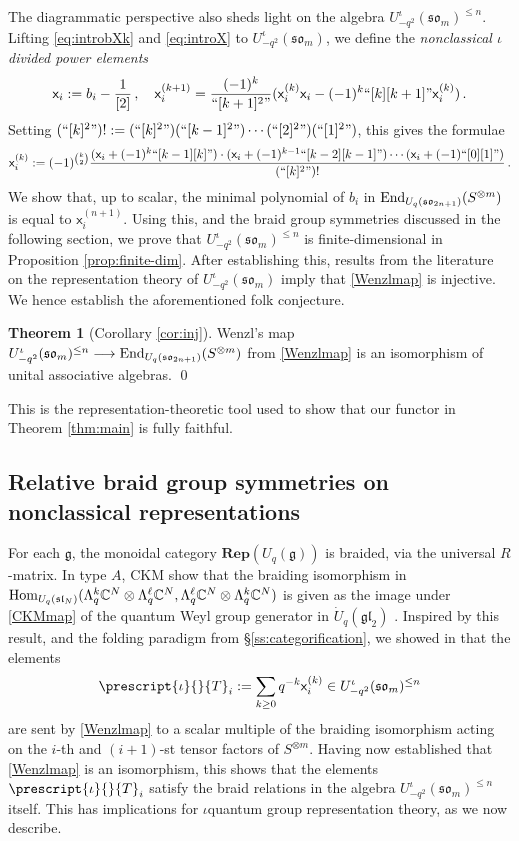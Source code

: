 \documentclass[10pt]{amsart}
\numberwithin{equation}{section}
\theoremstyle{definition}
\newtheorem{thm}{Theorem}[section]
\newcommand{\Hom}{{\rm Hom}}
\newcommand{\End}{{\rm End}}
\def\C{{\mathbb C}}
\newcommand{\sln}[1][n]{\mathfrak{sl}_{#1}}
\newcommand{\gln}[1][n]{\mathfrak{gl}_{#1}}
\newcommand{\son}[1][2n+1]{\mathfrak{so}_{#1}}
\newcommand{\som}[1][m]{\mathfrak{so}_{#1}}
\newcommand{\Rep}{\mathbf{Rep}}
\newcommand{\iqUsom}[1][m]{{U}^{\iota}_{-q^2}(\som[#1])}
\newcommand{\iQW}{\prescript{\iota}{}{T}}
\newcommand{\xxb}{\mathsf{x}}
\begin{document}
The diagrammatic perspective also sheds light on the algebra $\iqUsom^{\le n}$.
Lifting \eqref{eq:introbXk} and \eqref{eq:introX} to $\iqUsom$, 
we define the \emph{nonclassical $\iota$divided power elements}
\begin{equation}\label{eq:ddp}
\xxb_i:=b_i-\frac{1}{[2]} \, , \quad
\xxb_i^{(k+1)}=\frac{(-1)^k}{``[k+1]^2"}(\xxb_i^{(k)}\xxb_i- (-1)^k``[k][k+1]"\xxb_i^{(k)}) \, .
\end{equation}
Setting $(``[k]^2")! := (``[k]^2")(``[k-1]^2")\cdots(``[2]^2")(``[1]^2")$,
this gives the formulae
\[
\xxb_i^{(k)}:= (-1)^{\binom{k}{2}}\dfrac{(\xxb_i+(-1)^k``[k-1][k]")\cdot (\xxb_i+(-1)^{k-1}``[k-2][k-1]")\cdots (\xxb_i+(-1)``[0][1]")}{(``[k]^2")!} \, .
\]
We show that, up to scalar, the minimal polynomial of 
$b_i$ in $\End_{U_q(\son)}(S^{\otimes m})$ is equal to $\xxb_i^{(n+1)}$.
Using this, and the braid group symmetries discussed in the following section, 
we prove that $\iqUsom^{\le n}$ is finite-dimensional in Proposition \ref{prop:finite-dim}. 
After establishing this, results from the literature on the representation theory of $\iqUsom$ 
imply that \eqref{Wenzlmap} is injective. We hence establish the aforementioned folk conjecture.
\begin{thm}[{Corollary \ref{cor:inj}}]
Wenzl's map $\iqUsom^{\le n} \longrightarrow \End_{U_q(\son)}(S^{\otimes m})$ from \eqref{Wenzlmap}
is an isomorphism of unital associative algebras. \qed
	\end{thm}
This is the representation-theoretic tool used to show 
that our functor in Theorem \ref{thm:main} is fully faithful.

\subsection{Relative braid group symmetries on nonclassical representations}

For each $\mathfrak{g}$, the monoidal category $\Rep(U_q(\mathfrak{g}))$ is braided, 
via the universal $R$-matrix. 
In type $A$, CKM show that the braiding isomorphism in 
$\Hom_{U_q(\sln[N])}(\Lambda_q^k\C^N \otimes \Lambda_q^{\ell}\C^N
	, \Lambda_q^{\ell}\C^N \otimes \Lambda_q^k \C^N)$
is given as the image under \eqref{CKMmap} of the quantum Weyl group generator 
in $\dot{U}_q(\gln[2])$ \cite[\S 6]{CKM}. 
Inspired by this result, and the folding paradigm from \S \ref{ss:categorification}, 
we showed in \cite[Theorem 1.26]{BER} that the elements 
\begin{equation}\label{eq:iQW}
\iQW_i:= \sum_{k \ge 0} q^{-k}\xxb_i^{(k)} \in \iqUsom^{\le n} 
\end{equation}
are sent by \eqref{Wenzlmap} to a scalar multiple of the braiding isomorphism 
acting on the $i$-th and $(i+1)$-st tensor factors of $S^{\otimes m}$.
Having now established that \eqref{Wenzlmap} is an isomorphism, 
this shows that the elements $\iQW_i$ satisfy the braid relations in the algebra $\iqUsom^{\le n}$ itself.
This has implications for $\iota$quantum group representation theory, 
as we now describe.
\end{document}
